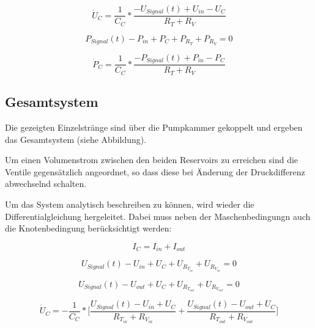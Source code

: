 \documentclass[fontsize=12pt, a4paper]{scrartcl}
\begin{document}
\begin{equation}
	\dot{U}_{C} = \frac{1}{C_{C}} * \frac{-U_{Signal}(t)+U_{in}-U_{C}}{R_{T}+R_{V}}
\end{equation}

\begin{equation}
	P_{Signal}(t) - P_{in} + P_{C} + P_{R_{T}} + P_{R_{V}} = 0
\end{equation}

\begin{equation}
	\dot{P}_{C} = \frac{1}{C_{C}} * \frac{-P_{Signal}(t)+P_{in}-P_{C}}{R_{T}+R_{V}}
\end{equation}


\subsection{Gesamtsystem}

Die gezeigten Einzelstränge sind über die Pumpkammer gekoppelt und ergeben das Gesamtsystem (siehe Abbildung).


\begin{center}
	
\end{center}

Um einen Volumenstrom zwischen den beiden Reservoirs zu erreichen sind die Ventile gegensätzlich angeordnet, so dass diese bei Änderung der Druckdifferenz abwechselnd schalten. 

Um das System analytisch beschreiben zu können, wird wieder die Differentialgleichung hergeleitet. Dabei muss neben der Maschenbedingungn auch die Knotenbedingung berücksichtigt werden:

\begin{equation}
	I_{C} = I_{in} + I_{out}
\end{equation}

\begin{equation}
	U_{Signal}(t) - U_{in} + U_{C} + U_{R_{T_{in}}} + U_{R_{V_{in}}} = 0
\end{equation}

\begin{equation}
	U_{Signal}(t) - U_{out} + U_{C} + U_{R_{T_{out}}} + U_{R_{V_{out}}} = 0
\end{equation}

\begin{equation}
	\dot{U}_{C} = - \frac{1}{C_{C}} * \biggl[\frac{U_{Signal}(t)-U_{in}+U_{C}}{R_{T_{in}}+R_{V_{in}}} + \frac{U_{Signal}(t)-U_{out}+U_{C}}{R_{T_{out}}+R_{V_{out}}}\biggr]
\end{equation}
\end{document}
